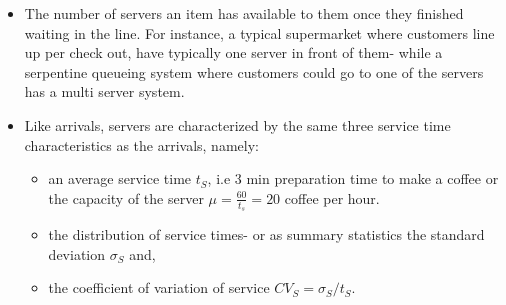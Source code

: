 \documentclass[
  letterpaper,
  DIV=11,
  numbers=noendperiod]{scrartcl}
\begin{document}
\begin{itemize}
\item
  The number of servers an item has available to them once they finished
  waiting in the line. For instance, a typical supermarket where
  customers line up per check out, have typically one server in front of
  them- while a serpentine queueing system where customers could go to
  one of the servers has a multi server system.
\item
  Like arrivals, servers are characterized by the same three service
  time characteristics as the arrivals, namely:

  \begin{itemize}
  \item
    an average service time \(t_S\), i.e 3 min preparation time to make
    a coffee or the capacity of the server \(\mu=\frac{60}{t_s}= 20\)
    coffee per hour.
  \item
    the distribution of service times- or as summary statistics the
    standard deviation \(\sigma_S\) and,
  \item
    the coefficient of variation of service \(CV_S=\sigma_S/t_S\).
  \end{itemize}
\end{itemize}
\end{document}
